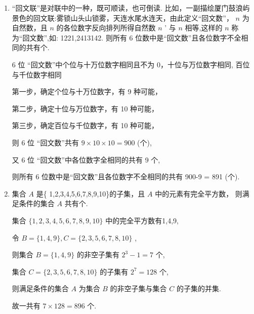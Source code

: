 \begin{enumerate}
\begin{enumerate}
\begin{jieda}
            在这 7 个数中随机选取两个不同的数，其和为奇数，则 2 必取,
            
            然后在剩余 6 个奇数中任选一个即可,
            
            所以，不同的取法种数为 6 种.
        \end{jieda}
        
        \item “回文联”是对联中的一种，既可顺读，也可倒读. 比如，一副描绘厦门鼓浪屿景色的回文联:雾锁山头山锁雾，天连水尾水连天，由此定义“回文数”， $n$ 为自然数，且 $n$ 的各位数字反向排列所得自然数 $n$ ’ 与 $n$ 相等,这样的 $n$ 称为“回文数”,如: 1221,2413142. 则所有 6 位数中是“回文数”且各位数字不全相同的共有个.
        \begin{jieda}
            6 位 “回文数”中个位与十万位数字相同且不为 0，十位与万位数字相同, 百位与千位数字相同
            
            第一步，确定个位与十万位数字，有 9 种可能，
            
            第二步，确定十位与万位数字，有 10 种可能，
            
            第三步，确定百位与千位数字，有 10 种可能，
            
            则 6 位 “回文数”共有 $9 \times  {10} \times  {10} = {900}$ (个),
            
            又 6 位 “回文数”中各位数字全相同的共有 9 个,
            
            则所有 6 位数中是“回文数”且各位数字不全相同的共有 900-9 = 891 (个).
        \end{jieda}
        
        \item 集合 $A$ 是\{ 1,2,3,4,5,6,7,8,9,10\}的子集，且 $A$ 中的元素有完全平方数， 则满足条件的集合 $A$ 共有个.
        \begin{jieda}
            集合 $\{ 1,2,3,4,5,6,7,8,9,{10}\}$ 中的完全平方数有1,4,9,
            
            令 $B = \{ 1,4,9\} ,C = \{ 2,3,5,6,7,8,{10}\}$ ,
            
            则集合 $B = \{ 1,4,9\}$ 的非空子集有 ${2}^{3} - 1 = 7$ 个,
            
            集合 $C = \{ 2,3,5,6,7,8,{10}\}$ 的子集有 ${2}^{7} = {128}$ 个,
            
            则满足条件的集合 $A$ 为集合 $B$ 的非空子集与集合 $C$ 的子集的并集.
            
            故一共有 $7 \times  {128} = {896}$ 个.
        \end{jieda}
    \end{enumerate}
    

\end{enumerate}
